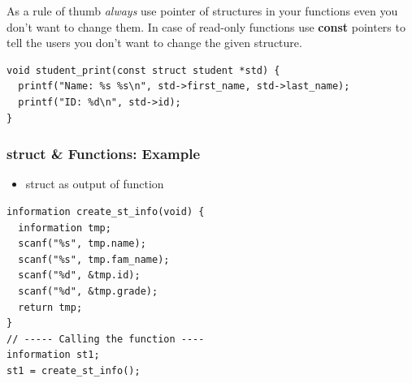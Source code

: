 \documentclass{../c-lecture}
\begin{document}
\begin{frame}[fragile]
  \begin{block}{}
    As a rule of thumb \textit{\color{Violet} always} use pointer of
    structures in your functions even you don't want to change them. In case
    of read-only functions use \textbf{\color{Cyan} const} pointers to
    tell the users you don't want to change the given structure.
  \end{block}
  \begin{verbatim}
void student_print(const struct student *std) {
  printf("Name: %s %s\n", std->first_name, std->last_name);
  printf("ID: %d\n", std->id);
}
  \end{verbatim}
\end{frame}

\begin{frame}[fragile]
  \frametitle{struct \& Functions: Example}
  \begin{itemize}
    \item struct as output of function
  \end{itemize}
  \scriptsize
  \begin{verbatim}
information create_st_info(void) {
  information tmp;
  scanf("%s", tmp.name);
  scanf("%s", tmp.fam_name);
  scanf("%d", &tmp.id);
  scanf("%d", &tmp.grade);
  return tmp;
}
// ----- Calling the function ----
information st1;
st1 = create_st_info();
  \end{verbatim}
\end{frame}
\end{document}
